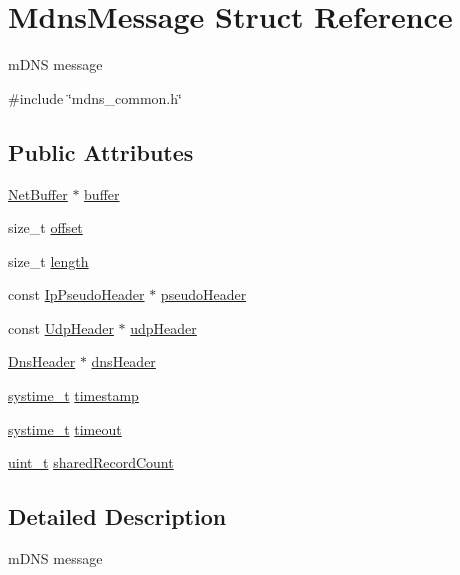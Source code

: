 \hypertarget{structMdnsMessage}{}\section{Mdns\+Message Struct Reference}
\label{structMdnsMessage}


m\+D\+NS message  




{\ttfamily \#include \char`\"{}mdns\+\_\+common.\+h\char`\"{}}

\subsection*{Public Attributes}
\begin{DoxyCompactItemize}
\item 
\hyperlink{structNetBuffer}{Net\+Buffer} $\ast$ \hyperlink{structMdnsMessage_ad8fde78bc679ed4dd16b6bc6ad39b94d}{buffer}
\item 
size\+\_\+t \hyperlink{structMdnsMessage_a2d5521f923d6c184a8923827f3cdcc1e}{offset}
\item 
size\+\_\+t \hyperlink{structMdnsMessage_ad1ebbfad05745924fdeee3389f270e52}{length}
\item 
const \hyperlink{structIpPseudoHeader}{Ip\+Pseudo\+Header} $\ast$ \hyperlink{structMdnsMessage_a8173839436f43ca92bf177cf22e4e61f}{pseudo\+Header}
\item 
const \hyperlink{udp_8h_a6877bae1da8326482f5e311875e52bce}{Udp\+Header} $\ast$ \hyperlink{structMdnsMessage_acd6f1b81f088caf914bbb89240d3f261}{udp\+Header}
\item 
\hyperlink{dns__common_8h_a5caa7816ce531b3920054e974a0679f3}{Dns\+Header} $\ast$ \hyperlink{structMdnsMessage_ac5ab08c143472d040db637c76c972cab}{dns\+Header}
\item 
\hyperlink{compiler__port_8h_ae3e32a98d431a02106616da3071832dd}{systime\+\_\+t} \hyperlink{structMdnsMessage_a525fb8a1b9335c262451c76a22a5883f}{timestamp}
\item 
\hyperlink{compiler__port_8h_ae3e32a98d431a02106616da3071832dd}{systime\+\_\+t} \hyperlink{structMdnsMessage_a3590edc47336ebe77d2c35ea4adf49ac}{timeout}
\item 
\hyperlink{compiler__port_8h_a12a1e9b3ce141648783a82445d02b58d}{uint\+\_\+t} \hyperlink{structMdnsMessage_a0d87d66898216dc4e73abc9a2189bdde}{shared\+Record\+Count}
\end{DoxyCompactItemize}


\subsection{Detailed Description}
m\+D\+NS message 

